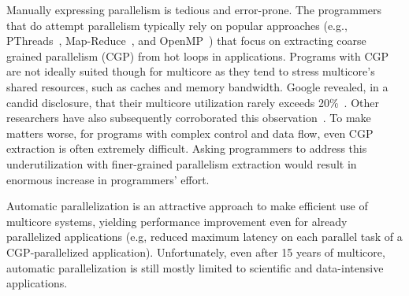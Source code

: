 
Manually expressing parallelism is tedious and error-prone. The programmers that
do attempt parallelism typically rely on popular approaches (e.g.,
PThreads~\cite{pthread:web}, Map-Reduce~\cite{dean:08:cacm}, and
OpenMP~\cite{openmp:web}) that focus on extracting coarse grained parallelism
(CGP) from hot loops in applications.
%
Programs with CGP are not ideally suited though for multicore as they tend to
stress multicore's shared resources, such as caches and memory bandwidth.
Google revealed, in a candid disclosure, that their multicore utilization rarely
exceeds 20\%~\cite{barroso:07:computer}. Other researchers have also
subsequently corroborated this observation~\cite{chung:13:isca}.
%
To make matters worse, for programs with complex control and data flow, even CGP
extraction is often extremely difficult.
%
Asking programmers to address this underutilization with finer-grained
parallelism extraction would result in enormous increase in programmers' effort.
%

%

Automatic parallelization is an attractive approach to make efficient use of
multicore systems, yielding performance improvement even for already parallelized
applications (e.g, reduced maximum latency on each parallel task of a
CGP-parallelized application). Unfortunately, even after 15 years of multicore,
automatic parallelization is still mostly limited to scientific and
data-intensive applications.

